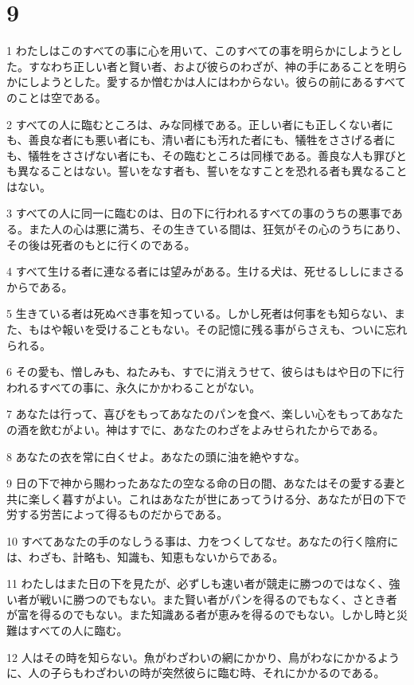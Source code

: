 \chapter{9}

\par 1 わたしはこのすべての事に心を用いて、このすべての事を明らかにしようとした。すなわち正しい者と賢い者、および彼らのわざが、神の手にあることを明らかにしようとした。愛するか憎むかは人にはわからない。彼らの前にあるすべてのことは空である。
\par 2 すべての人に臨むところは、みな同様である。正しい者にも正しくない者にも、善良な者にも悪い者にも、清い者にも汚れた者にも、犠牲をささげる者にも、犠牲をささげない者にも、その臨むところは同様である。善良な人も罪びとも異なることはない。誓いをなす者も、誓いをなすことを恐れる者も異なることはない。
\par 3 すべての人に同一に臨むのは、日の下に行われるすべての事のうちの悪事である。また人の心は悪に満ち、その生きている間は、狂気がその心のうちにあり、その後は死者のもとに行くのである。
\par 4 すべて生ける者に連なる者には望みがある。生ける犬は、死せるししにまさるからである。
\par 5 生きている者は死ぬべき事を知っている。しかし死者は何事をも知らない、また、もはや報いを受けることもない。その記憶に残る事がらさえも、ついに忘れられる。
\par 6 その愛も、憎しみも、ねたみも、すでに消えうせて、彼らはもはや日の下に行われるすべての事に、永久にかかわることがない。
\par 7 あなたは行って、喜びをもってあなたのパンを食べ、楽しい心をもってあなたの酒を飲むがよい。神はすでに、あなたのわざをよみせられたからである。
\par 8 あなたの衣を常に白くせよ。あなたの頭に油を絶やすな。
\par 9 日の下で神から賜わったあなたの空なる命の日の間、あなたはその愛する妻と共に楽しく暮すがよい。これはあなたが世にあってうける分、あなたが日の下で労する労苦によって得るものだからである。
\par 10 すべてあなたの手のなしうる事は、力をつくしてなせ。あなたの行く陰府には、わざも、計略も、知識も、知恵もないからである。
\par 11 わたしはまた日の下を見たが、必ずしも速い者が競走に勝つのではなく、強い者が戦いに勝つのでもない。また賢い者がパンを得るのでもなく、さとき者が富を得るのでもない。また知識ある者が恵みを得るのでもない。しかし時と災難はすべての人に臨む。
\par 12 人はその時を知らない。魚がわざわいの網にかかり、鳥がわなにかかるように、人の子らもわざわいの時が突然彼らに臨む時、それにかかるのである。
